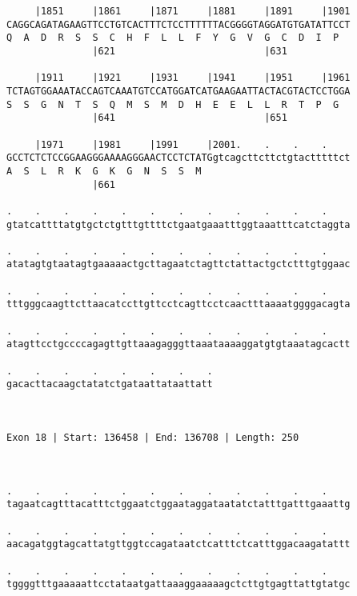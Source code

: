 \documentclass{article}
\begin{document}
\begin{Verbatim}
     |1851     |1861     |1871     |1881     |1891     |1901
CAGGCAGATAGAAGTTCCTGTCACTTTCTCCTTTTTTACGGGGTAGGATGTGATATTCCT
Q  A  D  R  S  S  C  H  F  L  L  F  Y  G  V  G  C  D  I  P  
               |621                          |631           
  
     |1911     |1921     |1931     |1941     |1951     |1961
TCTAGTGGAAATACCAGTCAAATGTCCATGGATCATGAAGAATTACTACGTACTCCTGGA
S  S  G  N  T  S  Q  M  S  M  D  H  E  E  L  L  R  T  P  G  
               |641                          |651           
  
     |1971     |1981     |1991     |2001.    .    .    .    
GCCTCTCTCCGGAAGGGAAAAGGGAACTCCTCTATGgtcagcttcttctgtactttttct
A  S  L  R  K  G  K  G  N  S  S  M                          
               |661                                         
  
.    .    .    .    .    .    .    .    .    .    .    .    
gtatcattttatgtgctctgtttgttttctgaatgaaatttggtaaatttcatctaggta
                                                            
.    .    .    .    .    .    .    .    .    .    .    .    
atatagtgtaatagtgaaaaactgcttagaatctagttctattactgctctttgtggaac
                                                            
.    .    .    .    .    .    .    .    .    .    .    .    
tttgggcaagttcttaacatccttgttcctcagttcctcaactttaaaatggggacagta
                                                            
.    .    .    .    .    .    .    .    .    .    .    .    
atagttcctgccccagagttgttaaagagggttaaataaaaggatgtgtaaatagcactt
                                                            
.    .    .    .    .    .    .    .
gacacttacaagctatatctgataattataattatt
                                    
                                    
 
Exon 18 | Start: 136458 | End: 136708 | Length: 250



.    .    .    .    .    .    .    .    .    .    .    .    
tagaatcagtttacatttctggaatctggaataggataatatctatttgatttgaaattg
                                                            
.    .    .    .    .    .    .    .    .    .    .    .    
aacagatggtagcattatgttggtccagataatctcatttctcatttggacaagatattt
                                                            
.    .    .    .    .    .    .    .    .    .    .    .    
tggggtttgaaaaattcctataatgattaaaggaaaaagctcttgtgagttattgtatgc
                                                            

\end{Verbatim}
\end{document}
